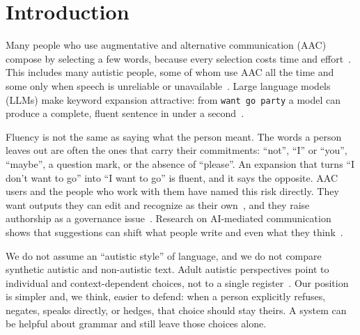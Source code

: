 \documentclass{ceurart}
\newcommand{\kw}[1]{\texttt{#1}}
\newcommand{\say}[1]{``#1''}
\begin{document}
\maketitle

\section{Introduction}

Many people who use augmentative and alternative communication (AAC) compose by selecting a few words, because every selection costs time and effort~\cite{valencia2023less,cai2024speakfaster}.
This includes many autistic people, some of whom use AAC all the time and some only when speech is unreliable or unavailable~\cite{zisk2019aac,donaldson2021everyone}.
Large language models (LLMs) make keyword expansion attractive: from \kw{want go party} a model can produce a complete, fluent sentence in under a second~\cite{shen2022kwickchat,cai2024speakfaster}.

Fluency is not the same as saying what the person meant.
The words a person leaves out are often the ones that carry their commitments: \say{not}, \say{I} or \say{you}, \say{maybe}, a question mark, or the absence of \say{please}.
An expansion that turns \say{I don't want to go} into \say{I want to go} is fluent, and it says the opposite.
AAC users and the people who work with them have named this risk directly. They want outputs they can edit and recognize as their own~\cite{valencia2023less,weinberg2026irobot}, and they raise authorship as a governance issue~\cite{griffiths2024consultation,griffiths2025authorship}.
Research on AI-mediated communication shows that suggestions can shift what people write and even what they think~\cite{hancock2020aimc,jakesch2023opinionated,arnold2020predictable}.

We do not assume an ``autistic style'' of language, and we do not compare synthetic autistic and non-autistic text.
Adult autistic perspectives point to individual and context-dependent choices, not to a single register~\cite{zisk2019aac,frisch2025autistic}.
Our position is simpler and, we think, easier to defend: when a person explicitly refuses, negates, speaks directly, or hedges, that choice should stay theirs.
A system can be helpful about grammar and still leave those choices alone.
\end{document}
